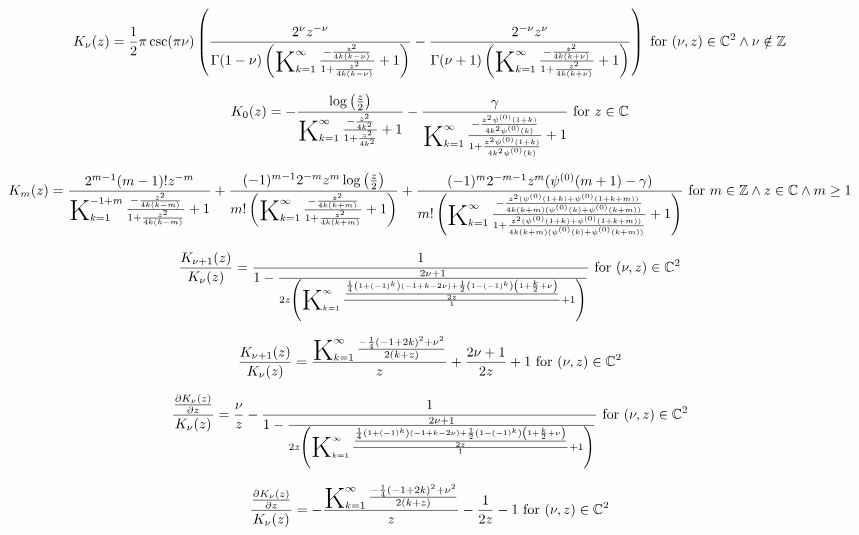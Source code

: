 \documentclass{article}
\newcommand{\bigK}{\mathop{\raisebox{-5pt}{\huge K}}}
\begin{document}
\[K_{\nu }(z)=\frac{1}{2} \pi  \csc (\pi  \nu ) \left(\frac{2^{\nu } z^{-\nu }}{\Gamma (1-\nu ) \left(\bigK_{k=1}^{\infty}\frac{-\frac{z^2}{4 k (k-\nu )}}{1+\frac{z^2}{4 k (k-\nu )}}+1\right)}-\frac{2^{-\nu } z^{\nu }}{\Gamma (\nu +1) \left(\bigK_{k=1}^{\infty}\frac{-\frac{z^2}{4 k (k+\nu )}}{1+\frac{z^2}{4 k (k+\nu )}}+1\right)}\right)\text{ for }(\nu ,z)\in \mathbb{C}^2\land \nu \notin \mathbb{Z}\] 

\[K_0(z)=-\frac{\log \left(\frac{z}{2}\right)}{\bigK_{k=1}^{\infty}\frac{-\frac{z^2}{4 k^2}}{1+\frac{z^2}{4 k^2}}+1}-\frac{\gamma }{\bigK_{k=1}^{\infty}\frac{-\frac{z^2 \psi ^{(0)}(1+k)}{4 k^2 \psi ^{(0)}(k)}}{1+\frac{z^2 \psi ^{(0)}(1+k)}{4 k^2 \psi ^{(0)}(k)}}+1}\text{ for }z\in \mathbb{C}\] 

\[K_m(z)=\frac{2^{m-1} (m-1)! z^{-m}}{\bigK_{k=1}^{-1+m}\frac{-\frac{z^2}{4 k (k-m)}}{1+\frac{z^2}{4 k (k-m)}}+1}+\frac{(-1)^{m-1} 2^{-m} z^m \log \left(\frac{z}{2}\right)}{m! \left(\bigK_{k=1}^{\infty}\frac{-\frac{z^2}{4 k (k+m)}}{1+\frac{z^2}{4 k (k+m)}}+1\right)}+\frac{(-1)^m 2^{-m-1} z^m (\psi ^{(0)}(m+1)-\gamma )}{m! \left(\bigK_{k=1}^{\infty}\frac{-\frac{z^2 (\psi ^{(0)}(1+k)+\psi ^{(0)}(1+k+m))}{4 k (k+m) (\psi ^{(0)}(k)+\psi ^{(0)}(k+m))}}{1+\frac{z^2 (\psi ^{(0)}(1+k)+\psi ^{(0)}(1+k+m))}{4 k (k+m) (\psi ^{(0)}(k)+\psi ^{(0)}(k+m))}}+1\right)}\text{ for }m\in \mathbb{Z}\land z\in \mathbb{C}\land m\geq 1\] 

\[\frac{K_{\nu +1}(z)}{K_{\nu }(z)}=\frac{1}{1-\frac{2 \nu +1}{2 z \left(\bigK_{k=1}^{\infty}\frac{\frac{\frac{1}{4} \left(1+(-1)^k\right) (-1+k-2 \nu )+\frac{1}{2} \left(1-(-1)^k\right) \left(1+\frac{k}{2}+\nu \right)}{2 z}}{1}+1\right)}}\text{ for }(\nu ,z)\in \mathbb{C}^2\] 

\[\frac{K_{\nu +1}(z)}{K_{\nu }(z)}=\frac{\bigK_{k=1}^{\infty}\frac{-\frac{1}{4} (-1+2 k)^2+\nu ^2}{2 (k+z)}}{z}+\frac{2 \nu +1}{2 z}+1\text{ for }(\nu ,z)\in \mathbb{C}^2\] 

\[\frac{\frac{\partial K_{\nu }(z)}{\partial z}}{K_{\nu }(z)}=\frac{\nu }{z}-\frac{1}{1-\frac{2 \nu +1}{2 z \left(\bigK_{k=1}^{\infty}\frac{\frac{\frac{1}{4} \left(1+(-1)^k\right) (-1+k-2 \nu )+\frac{1}{2} \left(1-(-1)^k\right) \left(1+\frac{k}{2}+\nu \right)}{2 z}}{1}+1\right)}}\text{ for }(\nu ,z)\in \mathbb{C}^2\] 

\[\frac{\frac{\partial K_{\nu }(z)}{\partial z}}{K_{\nu }(z)}=-\frac{\bigK_{k=1}^{\infty}\frac{-\frac{1}{4} (-1+2 k)^2+\nu ^2}{2 (k+z)}}{z}-\frac{1}{2 z}-1\text{ for }(\nu ,z)\in \mathbb{C}^2\] 
\end{document}

